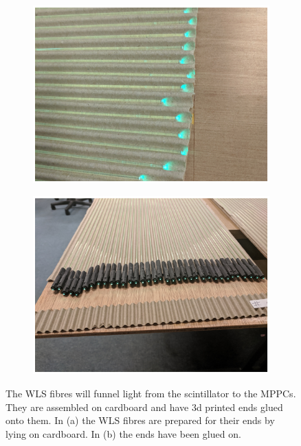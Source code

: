 \begin{figure}[!h]
\centering
\begin{subfigure}{.5\textwidth}
  \centering
  \includegraphics[width=\linewidth]{Chapter3/Figs/Raster/detCon013b_WlsFibres.png}
  \captionsetup{width=.9\linewidth}
  \caption{}
  \label{subFig:detCon013b_WlsFibres}
\end{subfigure}%
\begin{subfigure}{.5\textwidth}
  \centering
  \includegraphics[width=\linewidth]{Chapter3/Figs/Raster/detCon014b_WlsWithEnds.png}
  \captionsetup{width=.9\linewidth}
  \caption{}
  \label{subFig:detCon014b_WlsWithEnds}
\end{subfigure}
\caption{The WLS fibres will funnel light from the scintillator to the MPPCs. They are assembled on cardboard and have 3d printed ends glued onto them. In (a) the WLS fibres are prepared for their ends by lying on cardboard. In (b) the ends have been glued on.}
\label{fig:detCon_WlsFibres_WlsWithEnds}
\end{figure}

